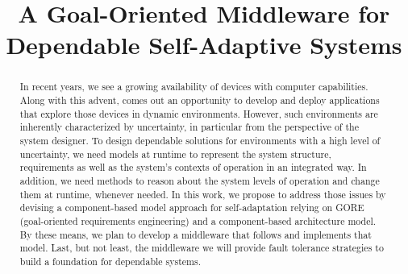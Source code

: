 \documentclass[mestrado]{pacotes/unb-cic}
\title{A Goal-Oriented Middleware for Dependable Self-Adaptive Systems}
\begin{document}
\maketitle

\pretextual



\begin{abstract}\textbf{}

In recent years, we see a growing availability of devices with computer capabilities. Along with this advent, comes out an opportunity to develop and deploy applications that explore those devices in dynamic environments. However, such environments are inherently characterized by uncertainty, in particular from the perspective of the system designer. To design dependable solutions for environments with a high level of uncertainty, we need models at runtime to represent the system structure, requirements as well as the system's contexts of operation in an integrated way. In addition, we need methods to reason about the system levels of operation and change them at runtime, whenever needed. In this work, we propose to address those issues by devising a component-based model approach for self-adaptation relying on GORE (goal-oriented requirements engineering) and a component-based architecture model. By these means, we plan to develop a middleware that follows and implements that model. Last, but not least, the middleware we will provide fault tolerance strategies to build a foundation for dependable systems.




\end{abstract}
\end{document}
